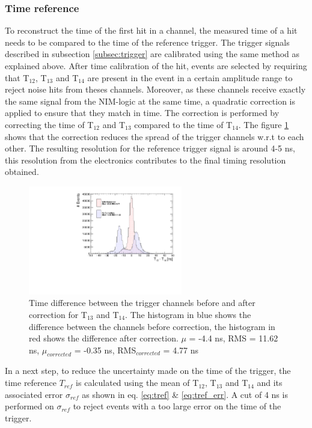 \documentclass[twoside,a4paper,11pt]{article}
\begin{document}
\subsubsection{Time reference}
To reconstruct the time of the first hit in a channel, the measured time of a hit needs to be compared to the time of the reference trigger. The trigger signals described in subsection \ref{subsec:trigger} are calibrated using the same method as explained above. After time calibration of the hit, events are selected by requiring that T$_{12}$, T$_{13}$ and T$_{14}$ are present in the event in a certain amplitude range to reject noise hits from theses channels. Moreover, as these channels receive exactly the same signal from the NIM-logic at the same time, a quadratic correction is applied to ensure that they match in time. The correction is performed by correcting the time of T$_{12}$ and T$_{13}$ compared to the time of T$_{14}$. The figure \ref{fig:T0_Correction} shows that the correction reduces the spread of the trigger channels w.r.t to each other. The resulting resolution for the reference trigger signal is around 4-5 ns, this resolution from the electronics contributes to the final timing resolution obtained.
\begin{figure}[htbp]
\begin{center}
\includegraphics[width=0.6\textwidth]{fig/T0s/T0_Resolution_6.pdf}
\caption{Time difference between the trigger channels before and after correction for T$_{13}$ and T$_{14}$. The histogram in blue shows the difference between the channels before correction, the histogram in red shows the difference after correction. $\mu$ = -4.4 ns, RMS = 11.62 ns, $\mu_{corrected}$ = -0.35 ns, RMS$_{corrected}$ = 4.77 ns}
\label{fig:T0_Correction}
\end{center}
\end{figure}
In a next step, to reduce the uncertainty made on the time of the trigger, the time reference $T_{ref}$ is calculated using the mean of T$_{12}$, T$_{13}$ and T$_{14}$ and its associated error $\sigma_{ref}$ as shown in eq. \ref{eq:tref} \& \ref{eq:tref_err}. A cut of 4 ns is performed on $\sigma_{ref}$ to reject events with a too large error on the time of the trigger.
\end{document}
